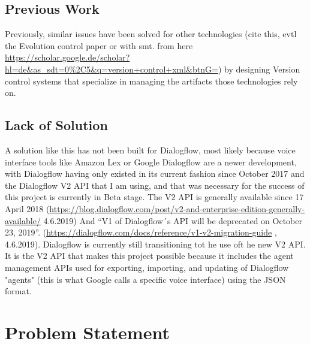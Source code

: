 \section{Previous Work}
Previously, similar issues have been solved for other technologies \citeNeeded (cite this, evtl the Evolution control paper or with smt. from here \url{https://scholar.google.de/scholar?hl=de&as_sdt=0%2C5&q=version+control+xml&btnG=})  by designing Version control systems that specialize in managing the artifacts those technologies rely on. 

\section{Lack of Solution}
A solution like this has not been built for Dialogflow, most likely because voice interface tools like Amazon Lex or Google Dialogflow are a newer development, with Dialogflow having only existed in its current fashion since October 2017 \citeNeeded and the Dialogflow V2 API that I am using, and that was necessary for the success of this project is currently in Beta stage. The V2 API is generally available since 17 April 2018
(\url{https://blog.dialogflow.com/post/v2-and-enterprise-edition-generally-available/}  4.6.2019)
And “V1 of Dialogflow´s API will be deprecated on October 23, 2019”. (\url{https://dialogflow.com/docs/reference/v1-v2-migration-guide} , 4.6.2019).
Dialogflow is currently still transitioning tot he use oft he new V2 API.
It is the V2 API that makes this project possible because it includes the agent management APIs used for exporting, importing, and updating of Dialogflow "agents" (this is what Google calls a specific voice interface) using the JSON format.

\chapter{Problem Statement}

